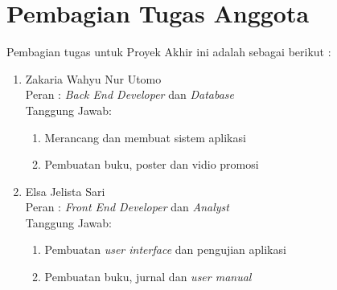 \section{Pembagian Tugas Anggota}
Pembagian tugas untuk Proyek Akhir ini adalah sebagai berikut :

\begin{enumerate}
	
\item	Zakaria Wahyu Nur Utomo \\
Peran	: \textit{Back End Developer} dan \textit{Database} \\
Tanggung Jawab:
\begin{enumerate}
\item	Merancang dan membuat sistem aplikasi
\item	Pembuatan buku, poster dan vidio promosi
\end{enumerate}
\item	Elsa Jelista Sari  \\
Peran	: \textit{Front End Developer} dan \textit{Analyst} \\
Tanggung Jawab: 
\begin{enumerate}
\item	Pembuatan \textit{user interface} dan pengujian aplikasi
\item	Pembuatan buku, jurnal dan \textit{user manual}
\end{enumerate}

\end{enumerate}
